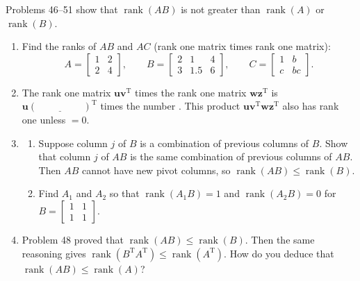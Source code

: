 \documentclass[14pt, a4paper]{article}
\begin{document}
\noindent Problems 46--51 show that $\operatorname{rank}(AB)$ is not greater than $\operatorname{rank}(A)$ or $\operatorname{rank}(B)$.
\begin{enumerate}[resume]
    \item Find the ranks of $AB$ and $AC$ (rank one matrix times rank one matrix):
          \[
              A = \begin{bmatrix} 1 & 2 \\ 2 & 4 \end{bmatrix}, \qquad
              B = \begin{bmatrix} 2 & 1 & 4 \\ 3 & 1.5 & 6 \end{bmatrix}, \qquad
              C = \begin{bmatrix} 1 & b \\ c & bc \end{bmatrix}.
          \]
    \item The rank one matrix $\mathbf{u}\mathbf{v}^{\mathrm{T}}$ times the rank one matrix $\mathbf{w}\mathbf{z}^{\mathrm{T}}$ is $\mathbf{u}(\underline{\hspace{2cm}})^{\mathrm{T}}$ times the number \underline{\hspace{2cm}}. This product $\mathbf{u}\mathbf{v}^{\mathrm{T}}\mathbf{w}\mathbf{z}^{\mathrm{T}}$ also has rank one unless \underline{\hspace{2cm}} $= 0$.


    \item
          \begin{enumerate}
              \item Suppose column $j$ of $B$ is a combination of previous columns of $B$. Show that column $j$ of $AB$ is the same combination of previous columns of $AB$. Then $AB$ cannot have new pivot columns, so $\operatorname{rank}(AB) \le \operatorname{rank}(B)$.
              \item Find $A_1$ and $A_2$ so that $\operatorname{rank}(A_1 B) = 1$ and $\operatorname{rank}(A_2 B) = 0$ for $B = \begin{bmatrix} 1 & 1 \\ 1 & 1 \end{bmatrix}$.
          \end{enumerate}

    \item Problem 48 proved that $\operatorname{rank}(AB) \le \operatorname{rank}(B)$. Then the same reasoning gives $\operatorname{rank}(B^{\mathrm{T}}A^{\mathrm{T}}) \le \operatorname{rank}(A^{\mathrm{T}})$. How do you deduce that $\operatorname{rank}(AB) \le \operatorname{rank}(A)$?


\end{enumerate}
\end{document}
